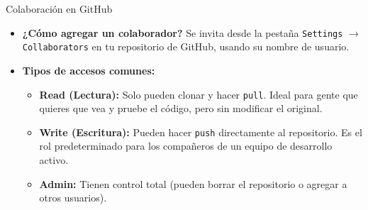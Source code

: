 \documentclass[11pt, aspectratio=169]{beamer}
\begin{document}
\begin{frame}{Colaboración en GitHub}
    \begin{itemize}
        \item \textbf{¿Cómo agregar un colaborador?} Se invita desde la pestaña \texttt{Settings} $\rightarrow$ \texttt{Collaborators} en tu repositorio de GitHub, usando su nombre de usuario.
        \item \textbf{Tipos de accesos comunes:}
        \begin{itemize}
            \item \textbf{Read (Lectura):} Solo pueden clonar y hacer \texttt{pull}. Ideal para gente que quieres que vea y pruebe el código, pero sin modificar el original.
            \item \textbf{Write (Escritura):} Pueden hacer \texttt{push} directamente al repositorio. Es el rol predeterminado para los compañeros de un equipo de desarrollo activo.
            \item \textbf{Admin:} Tienen control total (pueden borrar el repositorio o agregar a otros usuarios).
        \end{itemize}
    \end{itemize}
\end{frame}
\end{document}
